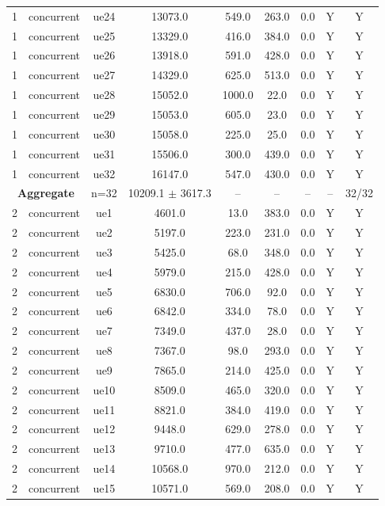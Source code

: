 \begin{table}[ht]
\begin{tabular}{|c|c|c|c|c|c|c|c|c|}
1 & concurrent & ue24 & 13073.0 & 549.0 & 263.0 & 0.0 & Y & Y \\
1 & concurrent & ue25 & 13329.0 & 416.0 & 384.0 & 0.0 & Y & Y \\
1 & concurrent & ue26 & 13918.0 & 591.0 & 428.0 & 0.0 & Y & Y \\
1 & concurrent & ue27 & 14329.0 & 625.0 & 513.0 & 0.0 & Y & Y \\
1 & concurrent & ue28 & 15052.0 & 1000.0 & 22.0 & 0.0 & Y & Y \\
1 & concurrent & ue29 & 15053.0 & 605.0 & 23.0 & 0.0 & Y & Y \\
1 & concurrent & ue30 & 15058.0 & 225.0 & 25.0 & 0.0 & Y & Y \\
1 & concurrent & ue31 & 15506.0 & 300.0 & 439.0 & 0.0 & Y & Y \\
1 & concurrent & ue32 & 16147.0 & 547.0 & 430.0 & 0.0 & Y & Y \\
\multicolumn{2}{|c|}{\textbf{Aggregate}} & n=32 & 10209.1 $\pm$ 3617.3 & -- & -- & -- & -- & 32/32 \\
\hline
2 & concurrent & ue1 & 4601.0 & 13.0 & 383.0 & 0.0 & Y & Y \\
2 & concurrent & ue2 & 5197.0 & 223.0 & 231.0 & 0.0 & Y & Y \\
2 & concurrent & ue3 & 5425.0 & 68.0 & 348.0 & 0.0 & Y & Y \\
2 & concurrent & ue4 & 5979.0 & 215.0 & 428.0 & 0.0 & Y & Y \\
2 & concurrent & ue5 & 6830.0 & 706.0 & 92.0 & 0.0 & Y & Y \\
2 & concurrent & ue6 & 6842.0 & 334.0 & 78.0 & 0.0 & Y & Y \\
2 & concurrent & ue7 & 7349.0 & 437.0 & 28.0 & 0.0 & Y & Y \\
2 & concurrent & ue8 & 7367.0 & 98.0 & 293.0 & 0.0 & Y & Y \\
2 & concurrent & ue9 & 7865.0 & 214.0 & 425.0 & 0.0 & Y & Y \\
2 & concurrent & ue10 & 8509.0 & 465.0 & 320.0 & 0.0 & Y & Y \\
2 & concurrent & ue11 & 8821.0 & 384.0 & 419.0 & 0.0 & Y & Y \\
2 & concurrent & ue12 & 9448.0 & 629.0 & 278.0 & 0.0 & Y & Y \\
2 & concurrent & ue13 & 9710.0 & 477.0 & 635.0 & 0.0 & Y & Y \\
2 & concurrent & ue14 & 10568.0 & 970.0 & 212.0 & 0.0 & Y & Y \\
2 & concurrent & ue15 & 10571.0 & 569.0 & 208.0 & 0.0 & Y & Y \\

\end{tabular}
\end{table}
